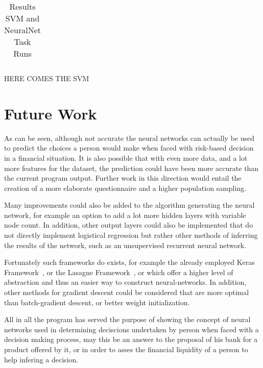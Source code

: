 \documentclass[12pt]{article}
\begin{document}
\begin{table}[h]
    \centering
    \caption{Results SVM and NeuralNet Task Runs}
    \label{tab:taskRuns}
    \begin{tabular}{c}
    
    \end{tabular}
\end{table}

HERE COMES THE SVM

\section{Future Work}
\label{sec:future_work}

As can be seen, although not accurate the neural networks can actually be used to predict the choices a person would make when faced with risk-based decision in a financial situation. It is also possible that with even more data, and a lot more features for the dataset, the prediction could have been more accurate than the current program output. Further work in this direction would entail the creation of a more elaborate questionnaire and a higher population sampling.

Many improvements could also be added to the algorithm generating the neural network, for example an option to add a lot more hidden layers with variable node count. In addition, other output layers could also be implemented that do not directly implement logistical regression but rather other methods of inferring the results of the network, such as an unsupervised recurrent neural network. 

Fortunately such frameworks do exists, for example  the already employed Keras Framework~\cite{keras}, or the Lasagne Framework~\cite{lasagne}, or which offer a higher level of abstraction and thus an easier way to construct neural-networks. In addition, other methods for gradient descent could be considered that are more optimal than batch-gradient descent, or better weight initialization.

All in all the program has served the purpose of showing the concept of neural networks used in determining deciscions undertaken by person when faced with a decision making process, may this be an answer to the proposal of his bank for a product offered by it, or in order to asses the financial liquidity of a person to help infering a decision.

\printbibliography{}
\end{document}
